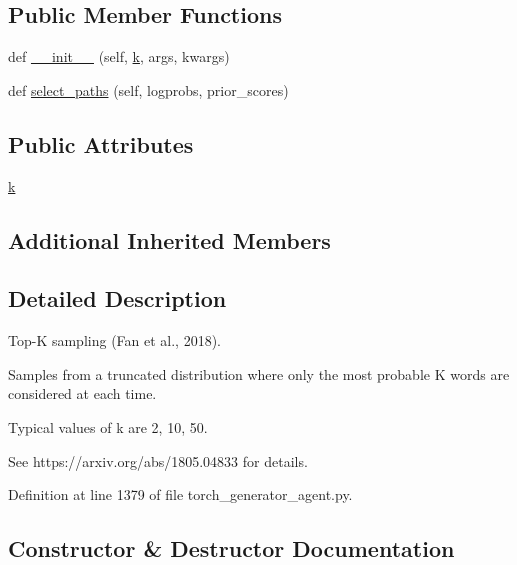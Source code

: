 \subsection*{Public Member Functions}
\begin{DoxyCompactItemize}
\item 
def \hyperlink{classparlai_1_1core_1_1torch__generator__agent_1_1TopKSampling_aa45e1c1fe90c563bf8057969417545e4}{\+\_\+\+\_\+init\+\_\+\+\_\+} (self, \hyperlink{classparlai_1_1core_1_1torch__generator__agent_1_1TopKSampling_a69d2f8e711e51151aa6649a4889e8243}{k}, args, kwargs)
\item 
def \hyperlink{classparlai_1_1core_1_1torch__generator__agent_1_1TopKSampling_a3ca83b8ee8aff13c05afbb973f948b6f}{select\+\_\+paths} (self, logprobs, prior\+\_\+scores)
\end{DoxyCompactItemize}
\subsection*{Public Attributes}
\begin{DoxyCompactItemize}
\item 
\hyperlink{classparlai_1_1core_1_1torch__generator__agent_1_1TopKSampling_a69d2f8e711e51151aa6649a4889e8243}{k}
\end{DoxyCompactItemize}
\subsection*{Additional Inherited Members}


\subsection{Detailed Description}
\begin{DoxyVerb}Top-K sampling (Fan et al., 2018).

Samples from a truncated distribution where only the most probable K words
are considered at each time.

Typical values of k are 2, 10, 50.

See https://arxiv.org/abs/1805.04833 for details.
\end{DoxyVerb}
 

Definition at line 1379 of file torch\+\_\+generator\+\_\+agent.\+py.



\subsection{Constructor \& Destructor Documentation}
\mbox{\label{classparlai_1_1core_1_1torch__generator__agent_1_1TopKSampling_aa45e1c1fe90c563bf8057969417545e4}} 
